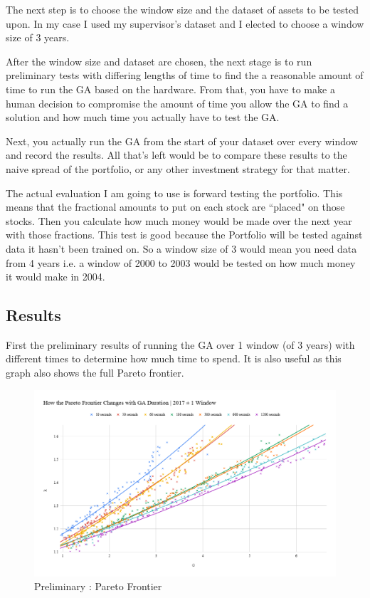 \documentclass[11pt]{article}
\begin{document}
    The next step is to choose the window size and the dataset of assets to be tested upon.
    In my case I used my supervisor's dataset \cite{Dataset} and I elected to choose a window
    size of 3 years.

    After the window size and dataset are chosen, the next stage is to run preliminary tests with
    differing lengths of time to find the a reasonable amount of time to run the GA based on
    the hardware. From that, you have to make a human decision to compromise the amount of time
    you allow the GA to find a solution and how much time you actually have to test the GA.

    Next, you actually run the GA from the start of your dataset over every window and record
    the results. All that's left would be to compare these results to the naive spread of the
    portfolio, or any other investment strategy for that matter.

    The actual evaluation I am going to use is forward testing the portfolio. This means that
    the fractional amounts to put on each stock are ``placed" on those stocks. Then you
    calculate how much money would be made over the next year with those fractions. This test
    is good because the Portfolio will be tested against data it hasn't been trained on.
    So a window size of 3 would mean you need data from 4 years i.e. a window of 2000 to 2003
    would be tested on how much money it would make in 2004.

\subsection{Results}

    First the preliminary results of running the GA over 1 window (of 3 years) with different
    times to determine how much time to spend. It is also useful as this graph also shows
    the full Pareto frontier.

    \begin{figure}[H] %
        \includegraphics[width=\textwidth]{HowTheParetoFrontierChangesWithGADuration_2017-1Window}
        \caption{Preliminary : Pareto Frontier}
            \label{fig:HowTheParetoFrontierChangesWithGADuration_2017-1Window}
    \end{figure}
\end{document}
